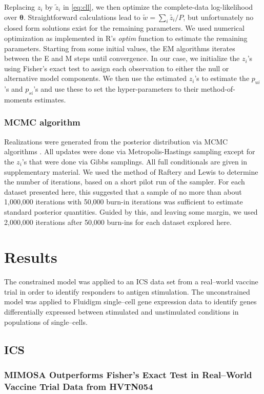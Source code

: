 \documentclass[11pt]{article}
\begin{document}
Replacing $z_i$ by $\tilde{z}_{i}$ in \eqref{eq:cll}, we then optimize the complete-data log-likelihood over $\boldsymbol{\theta}$. Straightforward calculations lead to 
$\tilde w = \sum_i{\tilde{z_i}}/P$, but unfortunately no closed form solutions exist for the remaining parameters. We used numerical optimization as implemented in R's \textit{optim} function to estimate the remaining parameters.  Starting from some initial values, the EM algorithms iterates between the E and M steps until convergence. In our case, we initialize the $z_{i}$'s using Fisher's exact test to assign each observation to either the null or alternative model components. We then use the estimated $z_i$'s to estimate the $p_{ui}$'s and $p_{si}$'s and use these to set the hyper-parameters to their method-of-moments estimates.

\subsubsection{MCMC algorithm}
Realizations were generated from the posterior distribution via MCMC algorithms \citep{Gelfand}. All updates were done via Metropolis-Hastings sampling except for the $z_i$'s that were done via Gibbs samplings.
All full conditionals are given in supplementary material. We used the method of Raftery and Lewis \citep{Raftery1,Raftery2} to determine the number of iterations, based on a short pilot run of the sampler. For each dataset presented here, this suggested that a sample of no more than about 1,000,000 iterations with 50,000 burn-in iterations was sufficient to estimate standard posterior quantities. Guided by this, and leaving some margin, we used 2,000,000 iterations after 50,000  burn-ins for each dataset explored here. 


\section{Results}
The constrained model was applied to an ICS data set from a real--world vaccine trial in order to identify responders to antigen stimulation. The unconstrained model was applied to Fluidigm single--cell gene expression data to identify genes differentially expressed between stimulated and unstimulated conditions in populations of single--cells.

\subsection{ICS}
\subsubsection*{MIMOSA Outperforms Fisher's Exact Test in Real--World Vaccine Trial Data from HVTN054}
\end{document}
